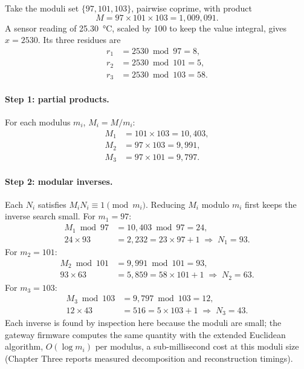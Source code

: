 \documentclass[12pt,a4paper,oneside]{book}
\begin{document}
Take the moduli set $\{97, 101, 103\}$, pairwise coprime, with product
\begin{equation*}
M = 97 \times 101 \times 103 = 1{,}009{,}091.
\end{equation*}
A sensor reading of \SI{25.30}{\celsius}, scaled by 100 to keep the value
integral, gives $x = 2530$. Its three residues are
\begin{align*}
r_1 &= 2530 \bmod 97 = 8, \\
r_2 &= 2530 \bmod 101 = 5, \\
r_3 &= 2530 \bmod 103 = 58.
\end{align*}

\paragraph{Step 1: partial products.} For each modulus $m_i$,
$M_i = M / m_i$:
\begin{align*}
M_1 &= 101 \times 103 = 10{,}403, \\
M_2 &= 97 \times 103 = 9{,}991, \\
M_3 &= 97 \times 101 = 9{,}797.
\end{align*}

\paragraph{Step 2: modular inverses.} Each $N_i$ satisfies
$M_i N_i \equiv 1 \pmod{m_i}$. Reducing $M_i$ modulo $m_i$ first keeps the
inverse search small. For $m_1 = 97$:
\begin{align*}
M_1 \bmod 97 &= 10{,}403 \bmod 97 = 24, \\
24 \times 93 &= 2{,}232 = 23 \times 97 + 1
  \;\Rightarrow\; N_1 = 93.
\end{align*}
For $m_2 = 101$:
\begin{align*}
M_2 \bmod 101 &= 9{,}991 \bmod 101 = 93, \\
93 \times 63 &= 5{,}859 = 58 \times 101 + 1
  \;\Rightarrow\; N_2 = 63.
\end{align*}
For $m_3 = 103$:
\begin{align*}
M_3 \bmod 103 &= 9{,}797 \bmod 103 = 12, \\
12 \times 43 &= 516 = 5 \times 103 + 1
  \;\Rightarrow\; N_3 = 43.
\end{align*}
Each inverse is found by inspection here because the moduli are small; the
gateway firmware computes the same quantity with the extended Euclidean
algorithm, $O(\log m_i)$ per modulus, a sub-millisecond cost at this
moduli size (Chapter Three reports measured decomposition and
reconstruction timings).
\end{document}
